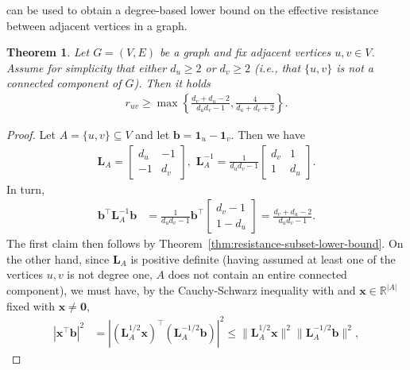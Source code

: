 \documentclass[11pt,a4paper]{amsart}
\newtheorem{theorem}{Theorem}[section]
\begin{document}
 can be used to obtain a degree-based lower bound on the effective resistance between adjacent vertices in a graph.

\begin{theorem}\label{thm:resistance-degree-bound}
    Let $G=(V, E)$ be a graph and fix adjacent vertices $u, v\in V$. Assume for simplicity that either $d_u\geq 2$ or $d_v\geq 2$ (i.e., that $\{u, v\}$ is not a connected component of $G$). Then it holds
        \begin{align*}
            r_{uv} \geq \max\left\{\frac{d_v + d_u-2}{d_ud_v - 1}, \frac{4}{d_u + d_v + 2}\right\}.
        \end{align*}
\end{theorem}

\begin{proof}
    Let $A=\{u, v\}\subseteq V$ and let $\mathbf{b}=\mathbf{1}_u - \mathbf{1}_v$. Then we have
        \begin{align*}
            \mathbf{L}_A = \begin{bmatrix}
                d_u & -1\\
                -1 & d_v
            \end{bmatrix},\,\, \mathbf{L}_A^{-1} = \frac{1}{d_ud_v - 1}\begin{bmatrix}
                d_v & 1\\
                1 & d_u
            \end{bmatrix}.
        \end{align*}    
    In turn,
        \begin{align*}
            \mathbf{b}^\top  \mathbf{L}_A^{-1} \mathbf{b} &= \frac{1}{d_ud_v - 1}\mathbf{b}^\top\begin{bmatrix}
                d_v - 1\\
                1 - d_u
            \end{bmatrix} = \frac{d_v + d_u-2}{d_ud_v - 1}.
        \end{align*}
    The first claim then follows by Theorem~\cref{thm:resistance-subset-lower-bound}. On the other hand, since $\mathbf{L}_A$ is positive definite (having assumed at least one of the vertices $u, v$ is not degree one, $A$ does not contain an entire connected component), we must have, by the Cauchy-Schwarz inequality with and $\mathbf{x}\in\mathbb{R}^{|A|}$ fixed with $\mathbf{x}\neq\mathbf{0}$,
        \begin{align*}
            |\mathbf{x}^\top \mathbf{b}|^2 &= |(\mathbf{L}_A^{1/2} \mathbf{x})^\top (\mathbf{L}_A^{-1/2} \mathbf{b})|^2 \leq \|\mathbf{L}_A^{1/2}\mathbf{x}\|^2\|\mathbf{L}_A^{-1/2}\mathbf{b}\|^2,

\end{align*}
\end{proof}
\end{document}
